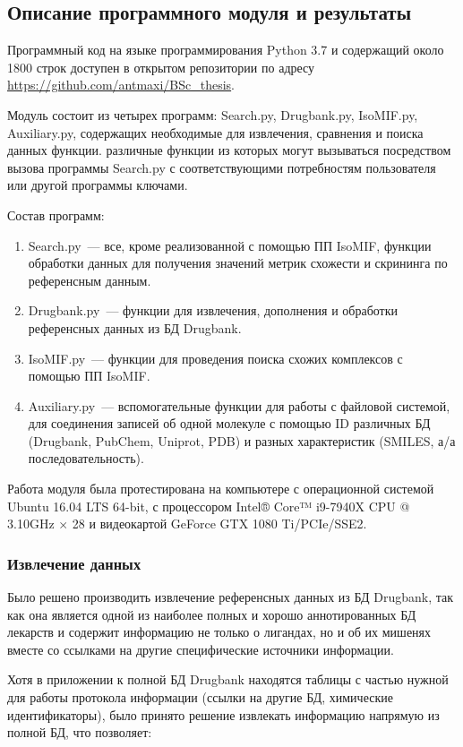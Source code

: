 \documentclass[a4paper,14pt]{article}         %
\newcommand{\sic}[1]{\LARGE\color{orange}{#1}\color{black}\Large}
\begin{document}
\subsection{Описание программного модуля и результаты}
Программный код на языке программирования Python 3.7 \cite{python37} и содержащий около 1800 строк \sic{обновлять} доступен в открытом репозитории по адресу \href{https://github.com/antmaxi/BSc\_thesis}{https://github.com/antmaxi/BSc\_thesis}.

Модуль состоит из четырех программ: Search.py, Drugbank.py, IsoMIF.py, Auxiliary.py, содержащих необходимые для извлечения, сравнения и поиска данных функции.
 различные функции из которых могут вызываться посредством вызова программы Search.py с соответствующими потребностям пользователя или другой программы ключами.
\fi

Состав программ:
\begin{enumerate}
	\item Search.py~--- все, кроме реализованной с помощью ПП IsoMIF, функции обработки данных для получения значений метрик схожести и скрининга по референсным данным.
	\item Drugbank.py~--- функции для извлечения, дополнения и обработки референсных данных из БД Drugbank.
	\item IsoMIF.py~--- функции для проведения поиска схожих комплексов с помощью ПП IsoMIF.
	\item Auxiliary.py~--- вспомогательные функции для работы с файловой системой, для соединения записей об одной молекуле с помощью ID различных БД (Drugbank, PubChem, Uniprot, PDB) и разных характеристик (SMILES, а/а последовательность).
\end{enumerate}

Работа модуля была протестирована на компьютере с операционной системой Ubuntu 16.04 LTS 64-bit, с процессором Intel® Core™ i9-7940X CPU @ 3.10GHz $\times$ 28 и видеокартой GeForce GTX 1080 Ti/PCIe/SSE2.
\subsubsection{Извлечение данных}
Было решено производить извлечение референсных данных из БД Drugbank, так как она является одной из наиболее полных и хорошо аннотированных БД лекарств \cite{Wishart2017} и содержит информацию не только о лигандах, но и об их мишенях вместе со ссылками на другие специфические источники информации. 

Хотя в приложении к полной БД Drugbank находятся таблицы с частью нужной для работы протокола информации (ссылки на другие БД, химические идентификаторы), было принято решение извлекать информацию напрямую из полной БД, что позволяет: 
\end{document}
